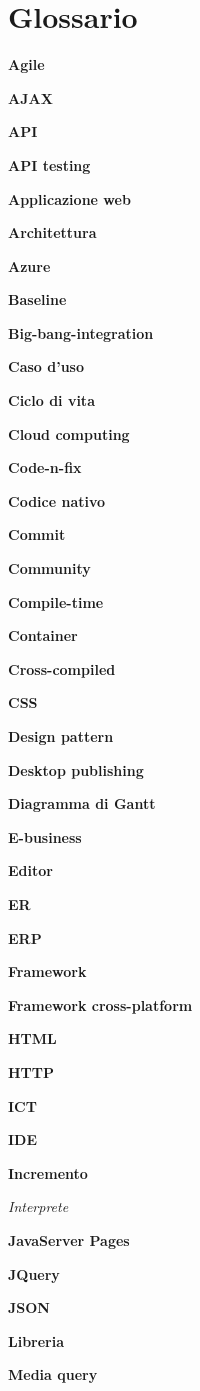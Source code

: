 \chapter{Glossario}

\textbf{Agile}

\textbf{AJAX}

\textbf{API}

\textbf{API testing}

\textbf{Applicazione web}

\textbf{Architettura}

\textbf{Azure}

\textbf{Baseline}

\textbf{Big-bang-integration}

\textbf{Caso d'uso}

\textbf{Ciclo di vita}

\textbf{Cloud computing}

\textbf{Code-n-fix}

\textbf{Codice nativo}

\textbf{Commit}

\textbf{Community}

\textbf{Compile-time}

\textbf{Container}

\textbf{Cross-compiled}

\textbf{CSS}

\textbf{Design pattern}

\textbf{Desktop publishing}

\textbf{Diagramma di Gantt}

\textbf{E-business}

\textbf{Editor}

\textbf{ER}

\textbf{ERP}

\textbf{Framework}

\textbf{Framework cross-platform}

\textbf{HTML}

\textbf{HTTP}

\textbf{ICT}

\textbf{IDE}

\textbf{Incremento}

\textit{Interprete}

\textbf{JavaServer Pages}

\textbf{JQuery}

\textbf{JSON}

\textbf{Libreria}

\textbf{Media query}

